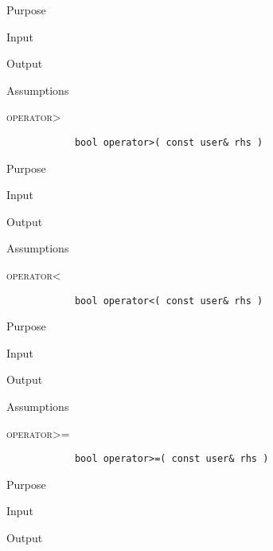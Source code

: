 \documentclass[pdftex, 12pt]{article}
\begin{document}
\begin{description}
\begin{description}
			\item{Purpose}

			\item{Input}

			\item{Output}

			\item{Assumptions}

		\end{description}

	\item{\textsc{operator>}}
		\begin{lstlisting}
			bool operator>( const user& rhs )
		\end{lstlisting}
		\begin{description}

			\item{Purpose}

			\item{Input}

			\item{Output}

			\item{Assumptions}

		\end{description}
	\item{\textsc{operator<}}
		\begin{lstlisting}
			bool operator<( const user& rhs )
		\end{lstlisting}
		\begin{description}

			\item{Purpose}

			\item{Input}

			\item{Output}

			\item{Assumptions}

		\end{description}
	\item{\textsc{operator>=}}
		\begin{lstlisting}
			bool operator>=( const user& rhs )
		\end{lstlisting}
		\begin{description}

			\item{Purpose}

			\item{Input}

			\item{Output}


\end{description}
\end{description}
\end{document}
